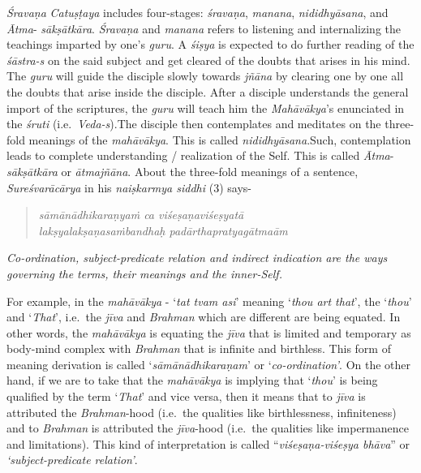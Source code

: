\emph{Śravaṇa} \emph{Catuṣṭaya} includes four-stages: \emph{śravaṇa}, \emph{manana}, \emph{nididhyāsana}, and \emph{Ātma}- \emph{sākṣātkāra}. \emph{Śravaṇa} and \emph{manana} refers to listening and internalizing the teachings imparted by one's \emph{guru}. A \emph{śiṣya} is expected to do further reading of the \emph{śāstra-s} on the said subject and get cleared of the doubts that arises in his mind. The \emph{guru} will guide the disciple slowly towards \emph{jñāna} by clearing one by one all the doubts that arise inside the disciple. After a disciple understands the general import of the scriptures, the \emph{guru} will teach him the \emph{Mahāvākya}'s enunciated in the \emph{śruti} (i.e.\ \emph{Veda-s}).The disciple then contemplates and meditates on the three-fold meanings of the \emph{mahāvākya}. This is called \emph{nididhyāsana}.\break Such, contemplation leads to complete understanding / realization of the Self. This is called \emph{Ātma}-\emph{sākṣātkāra} or \emph{ātmajñāna}. About the three-fold meanings of a sentence, \emph{Sureśvarācārya} in his \emph{naiṣkarmya siddhi} (3) says-

\begin{verse}
\emph{sāmānādhikaraṇyaṁ ca viśeṣaṇaviśeṣyatā }\\
\emph{lakṣyalakṣaṇasaṁbandhaḥ padārthapratyagātmaām }
\end{verse}

\emph{Co-ordination, subject-predicate relation and indirect indication are the ways governing the terms, their meanings and the inner-Self.}

For example, in the \emph{mahāvākya} - `\emph{tat tvam asi}' meaning `\emph{thou art that}', the `\emph{thou}' and `\emph{That}', i.e.\ the \emph{jīva} and \emph{Brahman} which 	are different are being equated. In other words, the \emph{mahāvākya} is equating the \emph{jīva} that is limited and temporary as body-mind complex with \emph{Brahman} that is infinite and birthless. This form of meaning derivation is called `\emph{sāmānādhikaraṇam}' or `\emph{co-ordination'}. On the other hand, if we are to take that the \emph{mahāvākya} is implying that `\emph{thou}' is being qualified by the term `\emph{That}' and vice versa, then it means that to \emph{jīva} is attributed the \emph{Brahman}-hood (i.e.\ the qualities like birthlessness, infiniteness) and to \emph{Brahman} is attributed the \emph{jīva}-hood (i.e.\ the qualities like impermanence and limitations). This kind of interpretation is called ``\emph{viśeṣaṇa-viśeṣya bhāva}'' or \emph{`subject-predicate relation'}.

